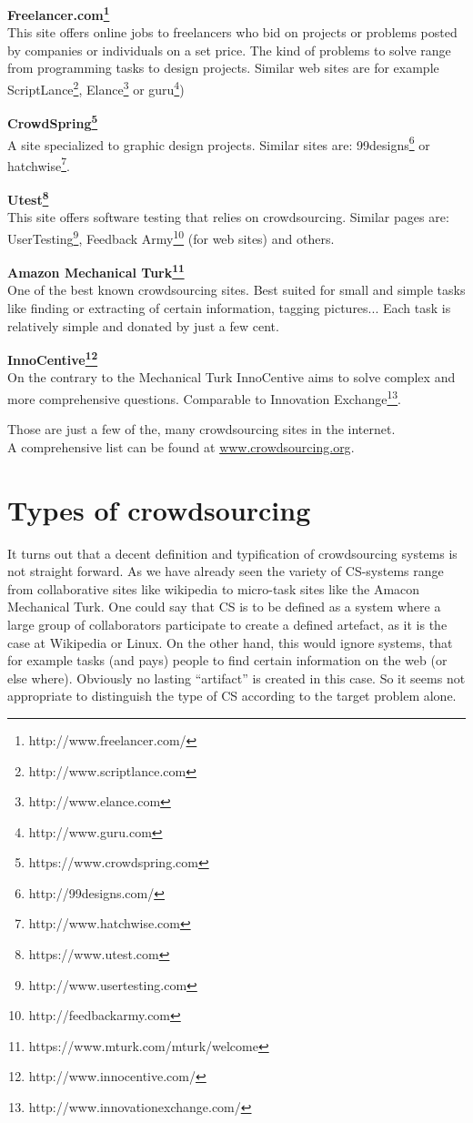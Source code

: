 \documentclass{acm_proc_article-sp}
\begin{document}
\textbf{Freelancer.com\footnote{http://www.freelancer.com/}}\\
This site offers online jobs to freelancers who bid on projects or problems posted by companies or individuals on a set price. The kind of problems to solve range from programming tasks to design projects. Similar web sites are for example ScriptLance\footnote{http://www.scriptlance.com}, Elance\footnote{http://www.elance.com} or guru\footnote{http://www.guru.com})

\textbf{CrowdSpring\footnote{https://www.crowdspring.com}}\\
A site specialized to graphic design projects. Similar sites are: 99designs\footnote{http://99designs.com/} or hatchwise\footnote{http://www.hatchwise.com}.

\textbf{Utest\footnote{https://www.utest.com}}\\
This site offers software testing that relies on crowdsourcing. Similar pages are: UserTesting\footnote{http://www.usertesting.com}, Feedback Army\footnote{http://feedbackarmy.com} (for web sites) and others.

\textbf{Amazon Mechanical Turk\footnote{https://www.mturk.com/mturk/welcome}}\\
One of the best known crowdsourcing sites. Best suited for small and simple tasks like finding or extracting of certain information, tagging pictures... Each task is relatively simple and donated by just a few cent.

\textbf{InnoCentive\footnote{http://www.innocentive.com/}}\\
On the contrary to the Mechanical Turk InnoCentive aims to solve complex and more comprehensive questions. Comparable to Innovation Exchange\footnote{http://www.innovationexchange.com/}.

Those are just a few of the, many crowdsourcing sites in the internet. \\A comprehensive list can be found at \href{http://www.crowdsourcing.org/directory}{www.crowdsourcing.org}.

\section{Types of crowdsourcing}
\label{sect:types}
It turns out that a decent definition and typification of 	crowdsourcing systems is not straight forward. As we have already seen the variety of CS-systems range from collaborative sites like wikipedia to micro-task sites like the Amacon Mechanical Turk. One could say that CS is to be defined as a system where a large group of collaborators participate to create a defined artefact, as it is the case at Wikipedia or Linux. On the other hand, this would ignore systems, that for example tasks (and pays) people to find certain information on the web (or else where). Obviously no lasting ``artifact'' is created in this case. So it seems not appropriate to distinguish the type of CS according to the target problem alone.
\end{document}
